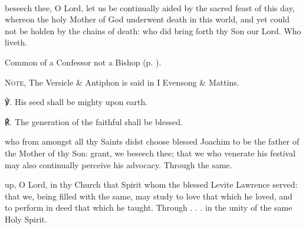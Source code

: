 
\secondEvensong
{}\\



\collect
{} beseech thee, O Lord, let us be continually aided by the sacred feast of this day, whereon the holy Mother of God underwent death in this world, and yet could not be holden by the chains of death: who did bring forth thy Son our Lord. Who liveth.



\begin{rubric}
	Common of a Confessor not a Bishop (p. \pageref{CommonConfessorNotBishop}).
\end{rubric}

\begin{rubric}
	\textsc{Note,} The Versicle \& Antiphon is said in I Evensong \& Mattins.
\end{rubric}

℣. His seed shall be mighty upon earth.

℟. The generation of the faithful shall be blessed.


\vspace{-1\baselineskip}

\collect
{} who from amongst all thy Saints didst choose blessed Joachim to be the father of the Mother of thy Son: grant, we beseech thee; that we who venerate his festival may also continually perceive his advocacy. Through the same.


\clearpage
{}

{} up, O Lord, in thy Church that Spirit whom the blessed Levite Lawrence served: that we, being filled with the same, may study to love that which he loved, and to perform in deed that which he taught. Through . . . in the unity of the same Holy Spirit.



